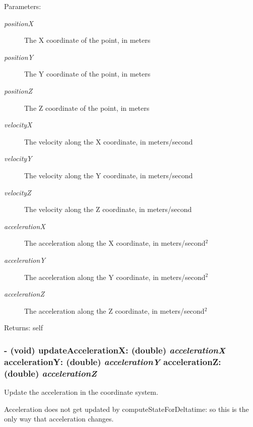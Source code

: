 \begin{Desc}
\item[Parameters:]
\begin{description}
\item[{\em positionX}]The X coordinate of the point, in meters \item[{\em positionY}]The Y coordinate of the point, in meters \item[{\em positionZ}]The Z coordinate of the point, in meters \item[{\em velocityX}]The velocity along the X coordinate, in meters/second \item[{\em velocityY}]The velocity along the Y coordinate, in meters/second \item[{\em velocityZ}]The velocity along the Z coordinate, in meters/second \item[{\em accelerationX}]The acceleration along the X coordinate, in meters/second$^{\mbox{2}}$  \item[{\em accelerationY}]The acceleration along the Y coordinate, in meters/second$^{\mbox{2}}$  \item[{\em accelerationZ}]The acceleration along the Z coordinate, in meters/second$^{\mbox{2}}$ \end{description}
\end{Desc}
\begin{Desc}
\item[Returns:]self \end{Desc}
\hypertarget{interface_i_m_s_r_point_object_1a32028d39d5f3e7fd976cac12040a54}{
\subsubsection[{updateAccelerationX:accelerationY:accelerationZ:}]{\setlength{\rightskip}{0pt plus 5cm}- (void) updateAccelerationX: (double) {\em accelerationX}\/ accelerationY: (double) {\em accelerationY}\/ accelerationZ: (double) {\em accelerationZ}}}
\label{interface_i_m_s_r_point_object_1a32028d39d5f3e7fd976cac12040a54}


Update the acceleration in the coordinate system. 

Acceleration does not get updated by computeStateForDeltatime: so this is the only way that acceleration changes.

